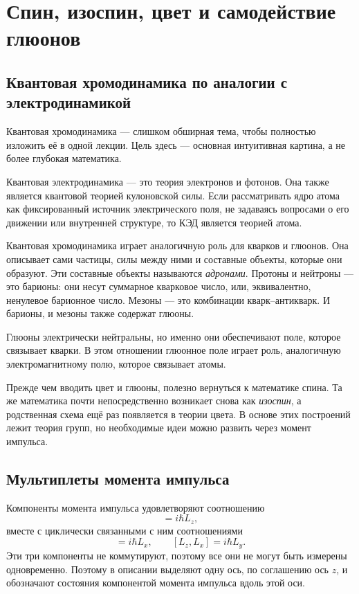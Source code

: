 \chapter{Спин, изоспин, цвет и самодействие глюонов}

\section{Квантовая хромодинамика по аналогии с электродинамикой}

Квантовая хромодинамика — слишком обширная тема, чтобы полностью изложить её в одной лекции. Цель здесь — основная интуитивная картина, а не более глубокая математика.

Квантовая электродинамика — это теория электронов и фотонов. Она также является квантовой теорией кулоновской силы. Если рассматривать ядро атома как фиксированный источник электрического поля, не задаваясь вопросами о его движении или внутренней структуре, то КЭД является теорией атома.

Квантовая хромодинамика играет аналогичную роль для кварков и глюонов. Она описывает сами частицы, силы между ними и составные объекты, которые они образуют. Эти составные объекты называются \emph{адронами}. Протоны и нейтроны — это барионы: они несут суммарное кварковое число, или, эквивалентно, ненулевое барионное число. Мезоны — это комбинации кварк--антикварк. И барионы, и мезоны также содержат глюоны.

Глюоны электрически нейтральны, но именно они обеспечивают поле, которое связывает кварки. В этом отношении глюонное поле играет роль, аналогичную электромагнитному полю, которое связывает атомы.

Прежде чем вводить цвет и глюоны, полезно вернуться к математике спина. Та же математика почти непосредственно возникает снова как \emph{изоспин}, а родственная схема ещё раз появляется в теории цвета. В основе этих построений лежит теория групп, но необходимые идеи можно развить через момент импульса.

\section{Мультиплеты момента импульса}

Компоненты момента импульса удовлетворяют соотношению
\begin{equation}
[L_x,L_y]=i\hbar L_z,
\end{equation}
вместе с циклически связанными с ним соотношениями
\begin{equation}
[L_y,L_z]=i\hbar L_x,
\qquad
[L_z,L_x]=i\hbar L_y.
\end{equation}
Эти три компоненты не коммутируют, поэтому все они не могут быть измерены одновременно. Поэтому в описании выделяют одну ось, по соглашению ось \(z\), и обозначают состояния компонентой момента импульса вдоль этой оси.


